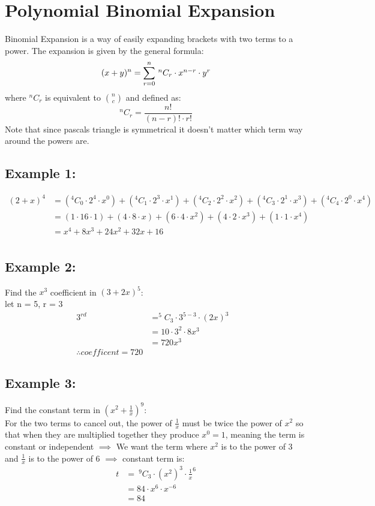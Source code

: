 \documentclass[class=article, crop=false]{standalone}
\begin{document}
\setlength{\mathindent}{1cm}

\section*{Polynomial Binomial Expansion}
Binomial Expansion is a way of easily expanding brackets with two terms to a power. The expansion is given by the general formula: 
\begin{equation*}
(x + y)^n = \sum^{n}_{r=0}$ $^nC_r \cdot x^{n-r} \cdot y^r
\end{equation*} 
where $^nC_r$ is equivalent to $\binom{n}{c}$ and defined as:
\begin{equation*}
^nC_r = \frac{n!}{(n-r)! \cdot r!}
\end{equation*}
Note that since pascals triangle is symmetrical it doesn't matter which term way around the powers are.

\subsection*{Example 1:}
\begin{align*}
(2 + x)^4  & =
  (^4C_0 \cdot 2^4 \cdot x^0) 
+ (^4C_1 \cdot 2^3 \cdot x^1) 
+ (^4C_2 \cdot 2^2 \cdot x^2) 
+ (^4C_3 \cdot 2^1 \cdot x^3) 
+ (^4C_4 \cdot 2^0 \cdot x^4)&\\
& =
  (1 \cdot 16 \cdot 1) 
+ (4 \cdot 8 \cdot x) 
+ (6 \cdot 4 \cdot x^2) 
+ (4 \cdot 2 \cdot x^3)
+ (1 \cdot 1 \cdot x^4)&\\
& = x^4 + 8x^3 + 24x^2 + 32x + 16&\\
\end{align*}

\subsection*{Example 2:}
Find the $x^3$ coefficient in $(3 + 2x)^5$:
\\
let n = 5, r = 3
\begin{align*}
3^{rd}\; & = ^5C_3 \cdot 3^{5-3} \cdot (2x)^3 &\\
 & = 10 \cdot 3^2 \cdot 8x^3 &\\
 & = 720x^3 &\\
\therefore coefficent = 720
\end{align*}

\subsection*{Example 3:}
Find the constant term in $(x^2 + \frac{1}{x})^9$:\\
For the two terms to cancel out, the power of $\frac{1}{x}$ must be twice the power of $x^2$ so that when they are multiplied together they produce $x^0 = 1$, meaning the term is constant or independent $\implies$ We want the term where $x^2$ is to the power of 3 and $\frac{1}{x}$ is to the power of 6 $\implies$ constant term is:
\begin{align*}
t & = \: ^9C_3 \cdot (x^2)^3 \cdot \frac{1}{x}^6\\
  & = 84 \cdot x^6 \cdot x^{-6}\\
  & = 84
\end{align*}
\end{document}
